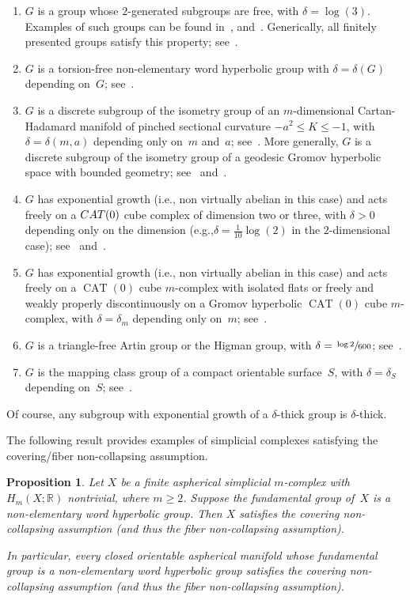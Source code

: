 \documentclass[11pt]{article}
\newcommand{\ie}{i.e.,\xspace}
\newcommand{\eg}{e.g.,\xspace}
\let\oldsfrac\sfrac
\renewcommand{\sfrac}[2]{{\oldsfrac{#1}{#2}}}
\newtheorem{proposition}[theorem]{Proposition}
\theoremstyle{definition}
\newcommand\R{{\mathbb R}}
\DeclareMathOperator{\CAT}{CAT}
\numberwithin{equation}{section}
\begin{document}
\begin{enumerate}
\item $G$ is a group whose $2$-generated subgroups are free, with $\delta=\log(3)$.
Examples of such groups can be found in~\cite{guba}, \cite{bumagin} and~\cite{AO96}.
Generically, all finitely presented groups satisfy this property; see~\cite{AO96}.
\item $G$ is a torsion-free non-elementary word hyperbolic group with $\delta=\delta(G)$ depending on~$G$; see~\cite{delzant}.
\item $G$ is a discrete subgroup of the isometry group of an $m$\nobreakdash-dimensional Cartan-Hadamard manifold of pinched sectional curvature $-a^2 \leq K \leq -1$, with $\delta=\delta(m,a)$ depending only on~$m$ and~$a$; see~\cite{BCG11}.
More generally, $G$ is a discrete subgroup of the isometry group of a geodesic Gromov hyperbolic space with bounded geometry; see~\cite{BCGS} and~\cite{BF}.
\item $G$ has exponential growth (\ie non virtually abelian in this case) and acts freely on a ${\rm CAT}(0)$ cube complex of dimension two or three, with $\delta>0$ depending only on the dimension (\eg $\delta=\frac{1}{10} \log(2)$ in the $2$-dimensional case); see~\cite{KS19} and~\cite{GJN}.
\item $G$ has exponential growth (\ie non virtually abelian in this case) and acts freely on a $\CAT(0)$ cube $m$\nobreakdash-complex with isolated flats or freely and weakly properly discontinuously on a Gromov hyperbolic $\CAT(0)$ cube $m$\nobreakdash-complex, with $\delta=\delta_m$ depending only on~$m$; see~\cite{GJN}. \label{IF}
\item $G$ is a triangle-free Artin group or the Higman group, with $\delta=\sfrac{\log2}{600}$; see~\cite{GJN}.
\item $G$ is the mapping class group of a compact orientable surface~$S$, with $\delta=\delta_S$ depending on~$S$; see~\cite{man10}.
\end{enumerate}
Of course, any subgroup with exponential growth of a $\delta$-thick group is $\delta$-thick.

The following result provides examples of simplicial complexes satisfying the covering/fiber non-collapsing assumption.

\begin{proposition} \label{prop:hyp}
Let $X$ be a finite aspherical simplicial $m$\nobreakdash-complex with $H_m(X;\R)$ nontrivial, where $m \geq 2$.
Suppose the fundamental group of~$X$ is a non-elementary word hyperbolic group.
Then $X$ satisfies the covering non-collapsing assumption (and thus the fiber non-collapsing assumption).

In particular, every closed orientable aspherical manifold whose fundamental group is a non-elementary word hyperbolic group satisfies the covering non-collapsing assumption (and thus the fiber non-collapsing assumption).
\end{proposition}
\end{document}
